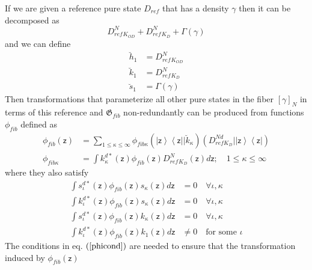 \documentclass[aps,preprint]{revtex4}%
\begin{document}
If we are given a reference pure state $D_{ref}$ that has a density $\gamma$
then it can be decomposed as
\begin{equation}
D_{ref}^{N}{}_{K_{OD}}+D_{ref}^{N}{}_{K_{D}}+\Gamma\left(  \gamma\right)
\end{equation}
and we can define
\begin{align}
\breve{h}_{1}  &  =D_{ref}^{N}{}_{K_{OD}}\nonumber\\
\breve{k}_{1}  &  =D_{ref}^{N}{}_{K_{D}}\nonumber\\
\breve{s}_{1}  &  =\Gamma\left(  \gamma\right)
\end{align}
Then transformations that parameterize all other pure states in the fiber
$\left[  \gamma\right]  _{N}$ in terms of this reference and $\mathfrak{G}%
_{fib}$ non-redundantly can be produced from functions $\phi_{fib}$ defined
as
\begin{align}
\phi_{fib}\left(  \mathsf{z}\right)   &  =\sum_{1\leq\kappa\leq\infty}%
\phi_{fib\kappa}\left(  \left|  \mathsf{z}\right\rangle \left\langle
\mathsf{z}\right|  |\breve{k}_{\kappa}\right)  \left(  D_{refK_{D}}%
^{Nd}|\left|  \mathsf{z}\right\rangle \left\langle \mathsf{z}\right|  \right)
\nonumber\\
\phi_{fib\kappa}  &  =\int k_{\kappa}^{d\ast}\left(  \mathsf{z}\right)
\phi_{fib}\left(  \mathsf{z}\right)  D_{ref}^{N}{}_{K_{D}}\left(
\mathsf{z}\right)  d\mathsf{z};\quad1\leq\kappa\leq\infty\label{refkd}%
\end{align}
where they also satisfy
\begin{align}
\int s_{\iota}^{d\ast}\left(  \mathsf{z}\right)  \phi_{fib}\left(
\mathsf{z}\right)  s_{\kappa}\left(  \mathsf{z}\right)  d\mathsf{z}  &
=0\quad\forall\iota,\kappa\nonumber\\
\int k_{\iota}^{d\ast}\left(  \mathsf{z}\right)  \phi_{fib}\left(
\mathsf{z}\right)  s_{\kappa}\left(  \mathsf{z}\right)  d\mathsf{z}  &
=0\quad\forall\iota,\kappa\nonumber\\
\int s_{\iota}^{d\ast}\left(  \mathsf{z}\right)  \phi_{fib}\left(
\mathsf{z}\right)  k_{\kappa}\left(  \mathsf{z}\right)  d\mathsf{z}  &
=0\quad\forall\iota,\kappa\nonumber\\
\int k_{\iota}^{d\ast}\left(  \mathsf{z}\right)  \phi_{fib}\left(
\mathsf{z}\right)  k_{1}\left(  \mathsf{z}\right)  d\mathsf{z}  &  \neq
0\quad\text{for some }\iota\label{phicond}%
\end{align}
The conditions in eq. $\left(  \ref{phicond}\right)  $ are needed to ensure
that the transformation induced by $\phi_{fib}\left(  \mathsf{z}\right)  $
\end{document}
